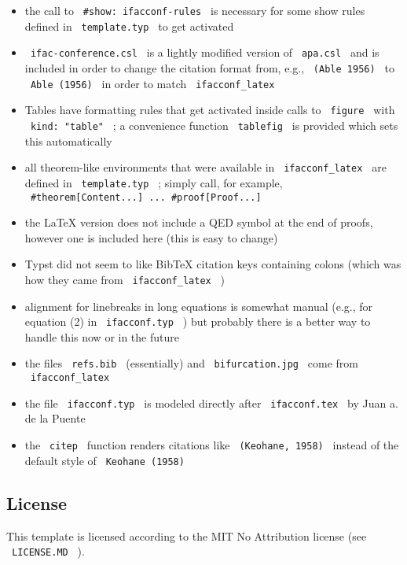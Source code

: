 \begin{itemize}
\tightlist
\item
  the call to \texttt{\ \#show:\ ifacconf-rules\ } is necessary for some
  show rules defined in \texttt{\ template.typ\ } to get activated
\item
  \texttt{\ ifac-conference.csl\ } is a lightly modified version of
  \texttt{\ apa.csl\ } and is included in order to change the citation
  format from, e.g., \texttt{\ (Able\ 1956)\ } to
  \texttt{\ Able\ (1956)\ } in order to match
  \texttt{\ ifacconf\_latex\ }
\item
  Tables have formatting rules that get activated inside calls to
  \texttt{\ figure\ } with \texttt{\ kind:\ "table"\ } ; a convenience
  function \texttt{\ tablefig\ } is provided which sets this
  automatically
\item
  all theorem-like environments that were available in
  \texttt{\ ifacconf\_latex\ } are defined in \texttt{\ template.typ\ }
  ; simply call, for example,
  \texttt{\ \#theorem{[}Content...{]}\ ...\ \#proof{[}Proof...{]}\ }
\item
  the LaTeX version does not include a QED symbol at the end of proofs,
  however one is included here (this is easy to change)
\item
  Typst did not seem to like BibTeX citation keys containing colons
  (which was how they came from \texttt{\ ifacconf\_latex\ } )
\item
  alignment for linebreaks in long equations is somewhat manual (e.g.,
  for equation (2) in \texttt{\ ifacconf.typ\ } ) but probably there is
  a better way to handle this now or in the future
\item
  the files \texttt{\ refs.bib\ } (essentially) and
  \texttt{\ bifurcation.jpg\ } come from \texttt{\ ifacconf\_latex\ }
\item
  the file \texttt{\ ifacconf.typ\ } is modeled directly after
  \texttt{\ ifacconf.tex\ } by Juan a. de la Puente
\item
  the \texttt{\ citep\ } function renders citations like
  \texttt{\ (Keohane,\ 1958)\ } instead of the default style of
  \texttt{\ Keohane\ (1958)\ }
\end{itemize}

\subsection{License}\label{license}

This template is licensed according to the MIT No Attribution license
(see \texttt{\ LICENSE.MD\ } ).

